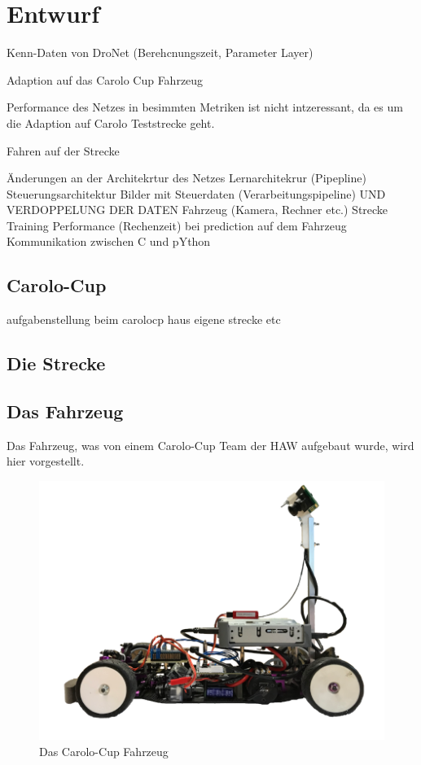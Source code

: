 %
\chapter{Entwurf}



Kenn-Daten von DroNet (Berehcnungszeit, Parameter Layer)


Adaption auf das Carolo Cup Fahrzeug

Performance des Netzes in besimmten Metriken ist nicht intzeressant, da es um die Adaption auf Carolo Teststrecke geht.

Fahren auf der Strecke 


Änderungen an der Architekrtur des Netzes
Lernarchitekrur (Pipepline)
Steuerungsarchitektur
Bilder mit Steuerdaten (Verarbeitungspipeline) UND VERDOPPELUNG DER DATEN
Fahrzeug (Kamera, Rechner etc.)
Strecke 
Training 
Performance (Rechenzeit) bei prediction auf dem Fahrzeug
Kommunikation zwischen C und pYthon


\section{Carolo-Cup}
aufgabenstellung beim carolocp
haus eigene strecke etc

\section{Die Strecke}

\section{Das Fahrzeug}
Das Fahrzeug, was von einem Carolo-Cup Team der HAW aufgebaut wurde, wird hier vorgestellt.


\begin{figure}
	\centering
	\includegraphics[scale=0.3]{figures/Fahrzeug.png}
	\caption{Das Carolo-Cup Fahrzeug}
	\label{img:Carolo-Fahrzeug}
\end{figure}